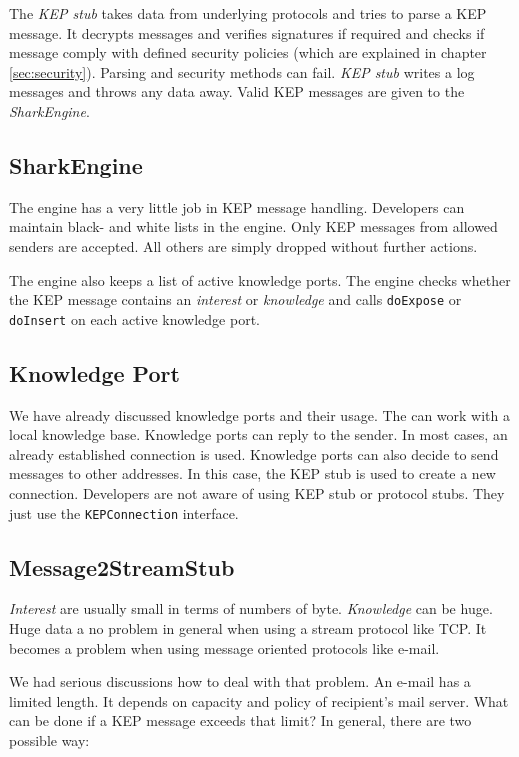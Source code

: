 The {\it KEP stub} takes data from underlying protocols and tries to parse a KEP message. It decrypts messages and verifies signatures if required and checks if message comply with defined security policies (which are explained in chapter \ref{sec:security}). Parsing and security methods can fail. {\it KEP stub} writes a log messages and throws any data away. Valid KEP messages are given to the {\it SharkEngine}. 

\subsection{SharkEngine}
The engine has a very little job in KEP message handling. Developers can maintain black- and white lists in the engine. Only KEP messages from allowed senders are accepted. All others are simply dropped without further actions.

The engine also keeps a list of active knowledge ports. The engine checks whether the KEP message contains an {\it interest} or {\it knowledge} and calls {\tt doExpose} or {\tt doInsert} on each active knowledge port.

\subsection{Knowledge Port}
We have already discussed knowledge ports and their usage. The can work with a local knowledge base. Knowledge ports can reply to the sender. In most cases, an already established connection is used. Knowledge ports can also decide to send messages to other addresses. In this case, the KEP stub is used to create a new connection. Developers are not aware of using KEP stub or protocol stubs. They just use the {\tt KEPConnection} interface.

\subsection{Message2StreamStub}
{\it Interest} are usually small in terms of numbers of byte. {\it Knowledge} can be huge. Huge data a no problem in general when using a stream protocol like TCP. It becomes a problem when using message oriented protocols like e-mail. 

We had serious discussions how to deal with that problem. An e-mail has a limited length. It depends on capacity and policy of recipient's mail server. What can be done if a KEP message exceeds that limit? In general, there are two possible way:

